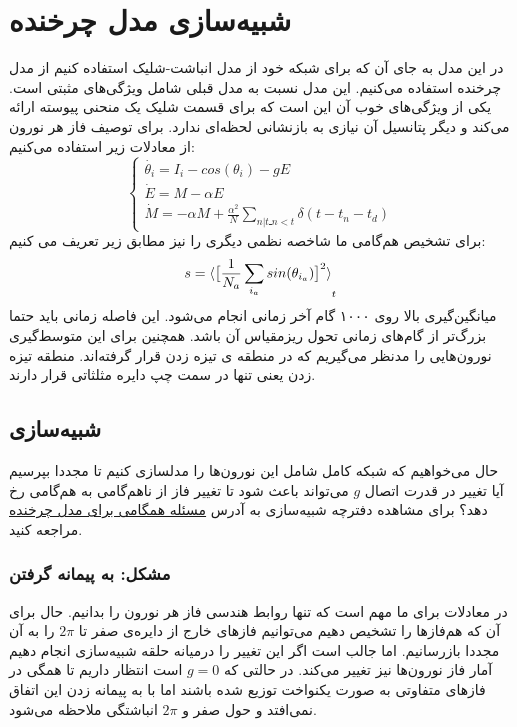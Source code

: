 \documentclass[12pt,onecolumn,a4paper]{article}
\begin{document}
\section{شبیه‌سازی مدل چرخنده}
در این مدل به جای آن که برای شبکه خود از مدل انباشت-شلیک استفاده کنیم از مدل چرخنده استفاده می‌کنیم. این مدل نسبت به مدل قبلی شامل ویژگی‌های مثبتی است. یکی از ویژگی‌های خوب آن این است که برای قسمت شلیک یک منحنی پیوسته ارائه می‌کند و دیگر پتانسیل آن نیازی به بازنشانی لحظه‌ای ندارد. برای توصیف فاز هر نورون از معادلات زیر استفاده می‌کنیم:
\begin{equation}
\begin{cases}
\dot{\theta_i}=I_i - cos(\theta_i) - g E \\
\dot{E} = M - \alpha E\\
\dot{M} = -  \alpha M + \frac{ \alpha^{2} }{N} \sum_{n|tـn<t} \delta(t - t_n - t_d)
\end{cases}
\end{equation}
برای تشخیص هم‌گامی ما شاخصه نظمی دیگری را نیز مطابق زیر تعریف می کنیم:
\begin{equation}
s =  \braket{ \big[ \frac{1}{N_a}\sum_{i_a} sin(\theta_{i_a}) \big]^{2}}_t
\label{eq:saman_amin_param}
\end{equation}
میانگین‌گیری بالا روی ۱۰۰۰ گام آخر زمانی انجام می‌شود. این فاصله زمانی باید حتما بزرگ‌تر از گام‌های زمانی تحول ریزمقیاس آن باشد. همچنین برای این متوسط‌گیری نورون‌هایی را مدنظر می‌گیریم که در منطقه ی تیزه زدن قرار گرفته‌اند. منطقه تیزه زدن یعنی تنها در سمت چپ دایره مثلثاتی قرار دارند.
\subsection{شبیه‌سازی}
حال می‌خواهیم که شبکه کامل شامل این نورون‌ها را مدلسازی کنیم تا مجددا بپرسیم آیا تغییر در قدرت اتصال $g$ می‌تواند باعث شود تا تغییر فاز از ناهم‌گامی به هم‌گامی رخ دهد؟ برای مشاهده دفترچه شبیه‌سازی به آدرس 
\href{run://..//scripts//rotational_model}{مسئله همگامی برای مدل چرخنده}
مراجعه کنید.
\subsubsection{مشکل: به پیمانه گرفتن}
در معادلات برای ما مهم است که تنها روابط هندسی فاز هر نورون را بدانیم. حال برای آن که هم‌فازها را تشخیص دهیم می‌توانیم فاز‌های خارج از دایره‌ی صفر تا $2\pi$ را به آن مجددا بازرسانیم. اما جالب است اگر این تغییر را درمیانه حلقه شبیه‌سازی انجام دهیم آمار فاز نورون‌ها نیز تغییر می‌کند. در حالتی که $g=0$ است انتظار داریم تا همگی در فاز‌های متفاوتی به صورت یکنواخت توزیع شده باشند اما با به پیمانه زدن این اتفاق نمی‌افتد و حول صفر و $2\pi$ انباشتگی ملاحظه می‌شود.
\end{document}
